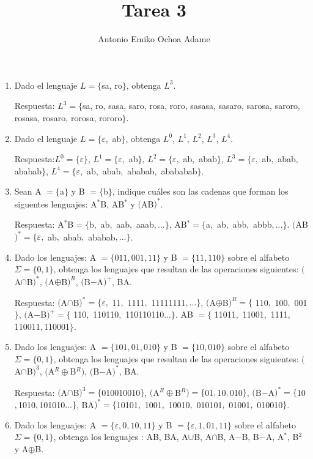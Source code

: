 \documentclass{article}
\begin{document}
\title{Tarea 3}
\author{Antonio Emiko Ochoa Adame}
\maketitle

\begin{enumerate}
	\item Dado el lenguaje $L = \{$sa, ro$\}$, obtenga $L^3$.

		Respuesta: $L^3 = \{$sa, ro, sasa, saro, rosa, roro, sasasa,
		sasaro, sarosa, saroro, rosasa, rosaro, rorosa, rororo$\}$.
	\item Dado el lenguaje $L = \{\varepsilon, $ ab$\}$, obtenga $L^0$,
		$L^1$, $L^2$, $L^3$, $L^4$.

		Respuesta:$L^0 = \{\varepsilon\}$, $L^1 = \{\varepsilon, $ ab$\}$,
		$L^2 = \{\varepsilon, $ ab$, $ abab$\}$,
		$L^3 = \{\varepsilon, $ ab$, $ abab$, $ ababab$\}$,
		$L^4 = \{\varepsilon, $ ab$, $ abab$, $ ababab$, $ abababab$\}$.
	\item Sean A $= \{$a$\}$ y B $= \{$b$\}$, indique cuáles son las cadenas
		que forman los siguentes lenguajes: A$^*$B, AB$^*$ y $($AB$)^*$.

		Respuesta: A$^*$B$ = \{$b$, $ ab$, $ aab$, $ aaab$, ...\}$,
		AB$^* = \{$a$, $ ab$, $ abb$, $ abbb$, ...\}$.
		$($AB$)^* = \{\varepsilon, $ ab$, $ abab$, $ ababab$, ...\}$.
	\item Dado los lenguajes: A $= \{011, 001, 11\}$ y B $= \{11, 110\}$
		sobre el alfabeto $\Sigma = \{0, 1\}$, obtenga los lenguajes
		que resultan de las operaciones siguientes: $($A$\cap$B$)^*$,
		$($A$\oplus$B$)^R$, $($B$-$A$)^+$, BA.

		Respuesta:
		$($A$\cap$B$)^* = \{\varepsilon,$ 11$,$ 1111$,$ 11111111$,...\}$,
		$($A$\oplus$B$)^R = \{$ 110$,$ 100$,$ 001$\}$,
		$($A$-$B$)^+ = \{$ 110$,$ 110110$,$ 110110110$...\}$.
		AB $= \{$ 11011$,$ 11001$,$ 1111$, $ 110011$, $110001$\}$.
	\item Dado los lenguajes: A $= \{101, 01, 010\}$ y B $= \{10, 010\}$
		sobre el alfabeto $\Sigma = \{0, 1\}$, obtenga los lenguajes
		que resultan de las operaciones siguientes: $($A$\cap$B$)^3$,
		$($A$^R\oplus$B$^R)$, $($B$-$A$)^*$, BA.

		Respuesta: $($A$\cap$B$)^3 = \{$010010010$\}$,
		$($A$^R\oplus$B$^R) = \{$01$, $10$, $010$\}$,
		$($B$-$A$)^* = \{$10$, $1010$, $101010$...\}$,
		BA$)^* = \{$10101$,$ 1001$,$ 10010$,$ 010101$,$ 01001$,$ 010010$\}$.
	\item Dado los lenguajes: A $= \{\varepsilon, 0, 10, 11\}$ y B $=
		\{\varepsilon, 1, 01, 11\}$
		sobre el alfabeto $\Sigma = \{0, 1\}$, obtenga los lenguajes
		: AB, BA, A$\cup$B,
		A$\cap$B, A$-$B, B$-$A, A$^*$, B$^2$ y A$\oplus$B.


\end{enumerate}
\end{document}

